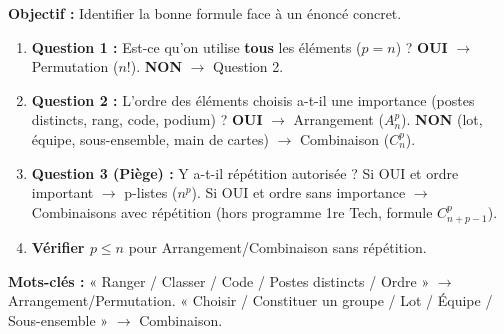 \documentclass[11pt]{article}
\begin{document}
\begin{methode}
\textbf{Objectif :} Identifier la bonne formule face à un énoncé concret.
\begin{enumerate}
    \item \textbf{Question 1 :} Est-ce qu'on utilise \textbf{tous} les éléments ($p=n$) ? \textbf{OUI} $\rightarrow$ Permutation ($n!$). \textbf{NON} $\rightarrow$ Question 2.
    \item \textbf{Question 2 :} L'ordre des éléments choisis a-t-il une importance (postes distincts, rang, code, podium) ? \textbf{OUI} $\rightarrow$ Arrangement ($A_n^p$). \textbf{NON} (lot, équipe, sous-ensemble, main de cartes) $\rightarrow$ Combinaison ($C_n^p$).
    \item \textbf{Question 3 (Piège) :} Y a-t-il répétition autorisée ? Si OUI et ordre important $\rightarrow$ p-listes ($n^p$). Si OUI et ordre sans importance $\rightarrow$ Combinaisons avec répétition (hors programme 1re Tech, formule $C_{n+p-1}^p$).
    \item \textbf{Vérifier $p \le n$} pour Arrangement/Combinaison sans répétition.
\end{enumerate}
\textbf{Mots-clés :} « Ranger / Classer / Code / Postes distincts / Ordre » $\rightarrow$ Arrangement/Permutation. « Choisir / Constituer un groupe / Lot / Équipe / Sous-ensemble » $\rightarrow$ Combinaison.
\end{methode}
\end{document}
